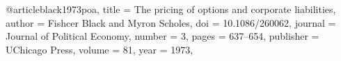 @article{black1973poa,
  title = {The pricing of options and corporate liabilities},
  author = {Fishcer Black and Myron Scholes},
  doi = {10.1086/260062},
  journal = {Journal of Political Economy},
  number = 3,
  pages = {637--654},
  publisher = {UChicago Press},
  volume = 81,
  year = 1973,
}
